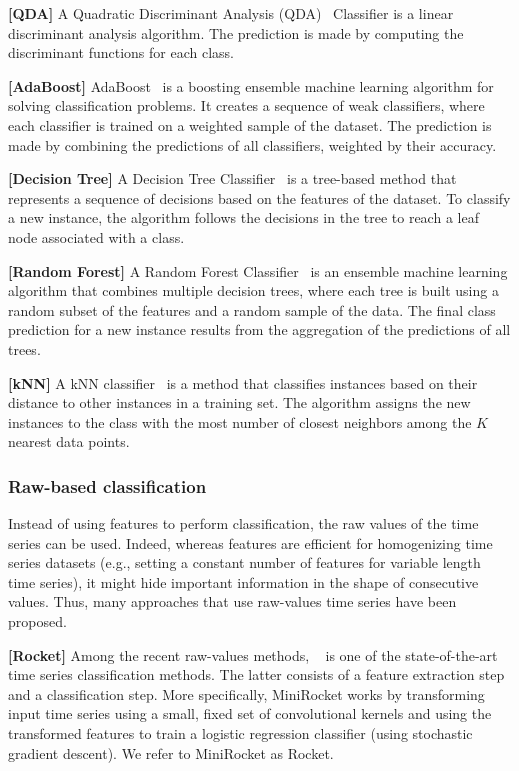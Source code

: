\noindent\textbf{[QDA]}
A Quadratic Discriminant Analysis (QDA)~\cite{Geisser1964PosteriorOF} Classifier is a linear discriminant analysis algorithm. The prediction is made by computing the discriminant functions for each class.

\noindent\textbf{[AdaBoost]}
AdaBoost~\cite{10.5555/646943.712093} is a boosting ensemble machine learning algorithm for solving classification problems. It creates a sequence of weak classifiers, where each classifier is trained on a weighted sample of the dataset. The prediction is made by combining the predictions of all classifiers, weighted by their accuracy.

\noindent\textbf{[Decision Tree]}
A Decision Tree Classifier~\cite{Hunt1966ExperimentsII} is a tree-based method that represents a sequence of decisions based on the features of the dataset. To classify a new instance, the algorithm follows the decisions in the tree to reach a leaf node associated with a class.

\noindent\textbf{[Random Forest]}
A Random Forest Classifier~\cite{598994} is an ensemble machine learning algorithm that combines multiple decision trees, where each tree is built using a random subset of the features and a random sample of the data. The final class prediction for a new instance results from the aggregation of the predictions of all trees.

\noindent\textbf{[kNN]}
A kNN classifier~\cite{Fix1989DiscriminatoryA} is a method that classifies instances based on their distance to other instances in a training set. The algorithm assigns the new instances to the class with the most number of closest neighbors among the $K$ nearest data points. 

\subsubsection{Raw-based classification}

Instead of using features to perform classification, the raw values of the time series can be used. Indeed, whereas features are efficient for homogenizing time series datasets (e.g., setting a constant number of features for variable length time series), it might hide important information in the shape of consecutive values. Thus, many approaches that use raw-values time series have been proposed.

\noindent\textbf{[Rocket]}
Among the recent raw-values methods, ~\cite{dempster2021minirocket} is one of the state-of-the-art time series classification methods. The latter consists of a feature extraction step and a classification step. More specifically, MiniRocket works by transforming input time series using a small, fixed set of convolutional kernels and using the transformed features to train a logistic regression classifier (using stochastic gradient descent). We refer to MiniRocket as Rocket.

